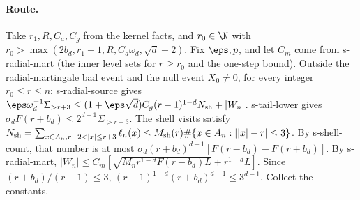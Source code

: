 \paragraph{Route.} Take $r_1,R,C_a,C_g$ from the kernel facts, and $r_0\in\N$ with $r_0>\max(2b_d,r_1+1,R,C_a\omega_d,\sqrt d+2)$. Fix $\eps,p$, and let $C_m$
come from s-radial-mart (the inner level sets for $r\geq r_0$ and the one-step bound). Outside the radial-martingale bad event and
the null event $X_0\neq0$, for every integer $r_0\leq r\leq n$:
s-radial-source gives $\eps\omega_d^{-1}\Sigma_{>r+3}\leq(1+\eps\sqrt d)C_g(r-1)^{1-d}N_{\rm sh}+|W_n|$.
s-tail-lower gives $\sigma_dF(r+b_d)\leq2^{d-1}\Sigma_{>r+3}$.
The shell visits satisfy $N_{\rm sh}=\sum_{x\in A_n,r-2<|x|\leq r+3}\ell_n(x)\leq M_{\rm sh}(r)\#\{x\in A_n:||x|-r|\leq3\}$.
By s-shell-count, that number is at most $\sigma_d(r+b_d)^{d-1}[F(r-b_d)-F(r+b_d)]$.
By s-radial-mart, $|W_n|\leq C_m[\sqrt{M_nr^{1-d}F(r-b_d)L}+r^{1-d}L]$.
Since $(r+b_d)/(r-1)\leq3$, $(r-1)^{1-d}(r+b_d)^{d-1}\leq3^{d-1}$. Collect the constants.
